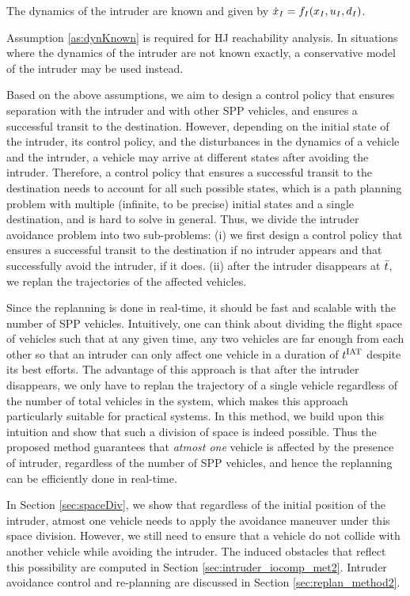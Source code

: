 \begin{assumption}
\label{as:dynKnown}
The dynamics of the intruder are known and given by $\dot{x}_I = f_I(x_I, u_I, d_I)$.
\end{assumption}

Assumption \ref{as:dynKnown} is required for HJ reachability analysis. In situations where the dynamics of the intruder are not known exactly, a conservative model of the intruder may be used instead.

Based on the above assumptions, we aim to design a control policy that ensures separation with the intruder and with other SPP vehicles, and ensures a successful transit to the destination. However, depending on the initial state of the intruder, its control policy, and the disturbances in the dynamics of a vehicle and the intruder, a vehicle may arrive at different states after avoiding the intruder. Therefore, a control policy that ensures a successful transit to the destination needs to account for all such possible states, which is a path planning problem with multiple (infinite, to be precise) initial states and a single destination, and is hard to solve in general. Thus, we divide the intruder avoidance problem into two sub-problems: (i) we first design a control policy that ensures a successful transit to the destination if no intruder appears and that successfully avoid the intruder, if it does. (ii) after the intruder disappears at $\bar{t}$, we replan the trajectories of the affected vehicles. 

Since the replanning is done in real-time, it should be fast and scalable with the number of SPP vehicles. Intuitively, one can think about dividing the flight space of vehicles such that at any given time, any two vehicles are far enough from each other so that an intruder can only affect one vehicle in a duration of $t^\text{IAT}$ despite its best efforts. The advantage of this approach is that after the intruder disappears, we only have to replan the trajectory of a single vehicle regardless of the number of total vehicles in the system, which makes this approach particularly suitable for practical systems. In this method, we build upon this intuition and show that such a division of space is indeed possible. Thus the proposed method guarantees that \textit{atmost one} vehicle is affected by the presence of intruder, regardless of the number of SPP vehicles, and hence the replanning can be efficiently done in real-time. 

In Section \ref{sec:spaceDiv}, we show that regardless of the initial position of the intruder, atmost one vehicle needs to apply the avoidance maneuver under this space division. However, we still need to ensure that a vehicle do not collide with another vehicle while avoiding the intruder. The induced obstacles that reflect this possibility are computed in Section \ref{sec:intruder_iocomp_met2}. Intruder avoidance control and re-planning are discussed in Section \ref{sec:replan_method2}.


